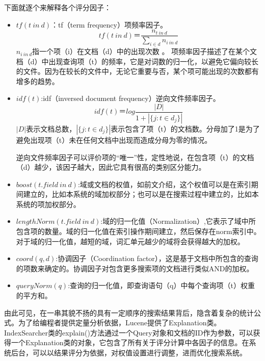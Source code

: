 \documentclass[12pt,a4paper]{article}
\begin{document}
	下面就逐个来解释各个评分因子：
	\begin{itemize}
		\item
	$ tf(t\ in\ d) $：tf（term frequency）项频率因子。
	\begin{equation}\label{eq:tf}
	tf(t\ in\ d)＝\frac{n_{t\ in\ d}}{\sum_{i \in d}{n_{i\ in\ d}}}
	\end{equation}
	$ {n_{i\ in\ d}} $指一个项（i）在文档（d）中的出现次数 。	
	项频率因子描述了在某个文档（d）中出现查询项（t）的频率，它是对词数的归一化，以避免它偏向较长的文件。因为在较长的文件中，无论它重要与否，某个项可能出现的次数都有增多的趋势。
		\item
	$ idf(t) $:idf（inversed document frequency）逆向文件频率因子。
	\begin{equation}\label{eq:idf}
	idf(t)＝log\frac{|D|}{1+|\{ j:t \in d_j\}|} 
	\end{equation}
	$ |D| $表示文档总数，$ |\{ j:t \in d_j\}| $表示包含了项（t）的文档数。分母加了1是为了避免出现项（t）未在任何文档中出现而造成分母为零的情况。
	
	逆向文件频率因子可以评价项的“唯一”性，定性地说，在包含项（t）的文档（d）越少，该因子越大，因此它具有很高的类别区分能力。
		\item
	$ boost(t.field\ in\ d) $:域或文档的权值，如前文介绍，这个权值可以是在索引期间建立的，比如本系统的域加权部分；也可以是在搜索过程中建立的，比如本系统的项加权部分。
		\item
	$ lengthNorm(t.field\ in\ d) $:域的归一化值（Normalization）,它表示了域中所包含项的数量。域的归一化值在索引操作期间建立，然后保存在norm索引中。对于域的归一化值，越短的域，词汇单元越少的域将会获得越大的加权。
		\item
	$ coord(q,d) $:协调因子（Coordination factor），这是基于文档中所包含的查询的项数来确定的。协调因子对包含更多搜索项的文档进行类似AND的加权。
		\item
	$ queryNorm(q) $:查询的归一化值，即查询语句（q）中每个查询项（t）权重的平方和。
	\end{itemize}
	
	由此可见，在一串其貌不扬的具有一定顺序的搜索结果背后，隐含着复杂的统计公式。为了给编程者提供定量分析依据，Lucene提供了Explanation类。IndexSearcher类的explain()方法通过一个Query对象和文档的ID作为参数，可以获得一个Explanation类的对象，它包含了所有关于评分计算中各因子的信息。在系统后台，可以以结果评分为依据，对权值设置进行调整，进而优化搜索系统。	
	
\end{document}
